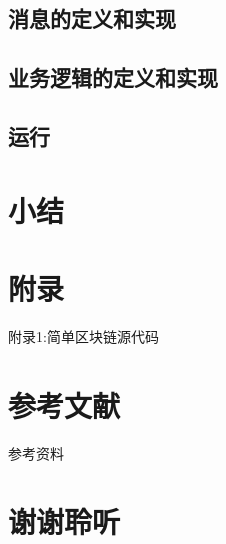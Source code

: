 \documentclass[11pt]{beamer}
\begin{document}
\subsection{消息的定义和实现}

\subsection{业务逻辑的定义和实现}

\subsection{运行}

\section{小结}

\section{附录}
\begin{frame}[allowframebreaks]{附录1:简单区块链源代码}
	
\end{frame}

\section{参考文献}
\begin{frame}{参考资料}


\end{frame}

\section*{谢谢聆听}
\end{document}
